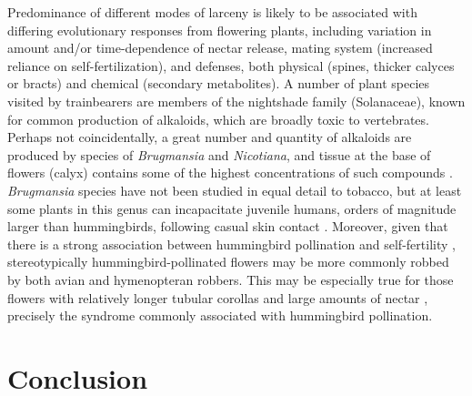 \documentclass[fleqn,10pt,lineno]{wlpeerj}
\begin{document}
%
%

Predominance of different modes of larceny is likely to be associated with differing evolutionary responses from flowering plants, including variation in amount and/or time-dependence of nectar release, mating system (increased reliance on self-fertilization), and defenses, both physical (spines, thicker calyces or bracts) and chemical (secondary metabolites). 
A number of plant species visited by trainbearers are members of the nightshade family (Solanaceae), known for common production of alkaloids, which are broadly toxic to vertebrates. 
Perhaps not coincidentally, a great number and quantity of alkaloids are produced by species of \textit{Brugmansia} and \textit{Nicotiana}, and tissue at the base of flowers (calyx) contains some of the highest concentrations of such compounds \citep{saitoh1985, alves2007}. 
\textit{Brugmansia} species have not been studied in equal detail to tobacco, but at least some plants in this genus can incapacitate juvenile humans, orders of magnitude larger than hummingbirds, following casual skin contact \citep{andreola2008}. 
Moreover, given that there is a strong association between hummingbird pollination and self-fertility \citep{wolowski2013}, stereotypically hummingbird-pollinated flowers may be more commonly robbed by both avian and hymenopteran robbers. 
This may be especially true for those flowers with relatively longer tubular corollas and large amounts of nectar \citep{lara2001,rojas-nossa2016}, precisely the syndrome commonly associated with hummingbird pollination.

%
%

%
%
%


%
%

\section*{Conclusion}
\end{document}
